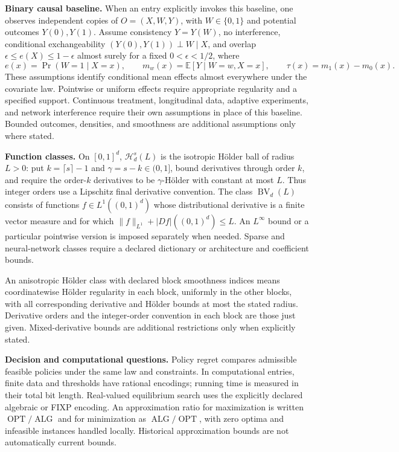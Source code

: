 \documentclass[11pt,a4paper]{article}
\newcommand{\E}{\mathbb E}
\begin{document}
\textbf{Binary causal baseline.}
When an entry explicitly invokes this baseline, one observes independent
copies of $O=(X,W,Y)$, with $W\in\{0,1\}$ and potential outcomes $Y(0),Y(1)$.
Assume consistency $Y=Y(W)$, no interference, conditional exchangeability
$(Y(0),Y(1))\perp W\mid X$, and overlap
$\epsilon\leq e(X)\leq1-\epsilon$ almost surely for a fixed
$0<\epsilon<1/2$, where
\[
 e(x)=\Pr(W=1\mid X=x),\qquad
 m_w(x)=\E[Y\mid W=w,X=x],\qquad
 \tau(x)=m_1(x)-m_0(x).
\]
These assumptions identify conditional mean effects almost everywhere
under the covariate law. Pointwise or uniform effects require appropriate
regularity and a specified support. Continuous treatment, longitudinal
data, adaptive experiments, and network interference require their own
assumptions in place of this baseline. Bounded outcomes, densities, and
smoothness are additional assumptions only where stated.

\textbf{Function classes.}
On $[0,1]^d$, $\mathcal H_d^s(L)$ is the isotropic Hölder ball of radius
$L>0$: put $k=\lceil s\rceil-1$ and $\gamma=s-k\in(0,1]$, bound derivatives
through order $k$, and require the order-$k$ derivatives to be
$\gamma$-Hölder with constant at most $L$. Thus integer orders use a
Lipschitz final derivative convention. The class
$\operatorname{BV}_d(L)$ consists of functions $f\in L^1((0,1)^d)$ whose
distributional derivative is a finite vector measure and for which
$\|f\|_{L^1}+|Df|((0,1)^d)\leq L$.
An $L^\infty$ bound or a particular pointwise version is imposed separately
when needed. Sparse and neural-network classes require a declared
dictionary or architecture and coefficient bounds.

An anisotropic H\"older class with declared block smoothness indices means
coordinatewise H\"older regularity in each block, uniformly in the other
blocks, with all corresponding derivative and H\"older bounds at most
the stated radius. Derivative orders and the integer-order convention in
each block are those just given. Mixed-derivative bounds are additional
restrictions only when explicitly stated.

\textbf{Decision and computational questions.}
Policy regret compares admissible feasible policies under the same law and
constraints. In computational entries, finite data and thresholds have
rational encodings; running time is measured in their total bit length.
Real-valued equilibrium search uses the explicitly declared algebraic or
FIXP encoding. An approximation ratio for maximization is written
$\operatorname{OPT}/\operatorname{ALG}$ and for minimization as
$\operatorname{ALG}/\operatorname{OPT}$, with zero optima and infeasible
instances handled locally. Historical approximation bounds are not
automatically current bounds.
\end{document}
